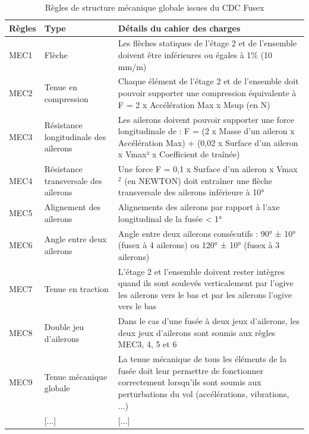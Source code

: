 \begin{table}[h!]
\centering
\begin{tabular}{|p{1.2cm}|p{4cm}|p{10cm}|}
\hline
Règles & Type & Détails du cahier des charges \\ \hline

MEC1  & Flèche & Les flèches statiques de l’étage 2 et de l’ensemble doivent être inférieures ou égales à 1\% (10 mm/m) \\ \hline
MEC2  & Tenue en compression & Chaque élément de l’étage 2 et de l’ensemble doit pouvoir supporter une compression équivalente à F = 2 x Accélération Max x Msup (en N) \\ \hline
MEC3  & Résistance longitudinale des ailerons & Les ailerons doivent pouvoir supporter une force longitudinale de : F = (2 x Masse d’un aileron x Accélération Max) + (0,02 x Surface d’un aileron x Vmax² x Coefficient de traînée) \\ \hline
MEC4  & Résistance transversale des ailerons & Une force F = 0,1 x Surface d’un aileron x Vmax$^2$ (en NEWTON) doit entraîner une flèche transversale des ailerons inférieure à 10° \\ \hline
MEC5  & Alignement des ailerons & Alignements des ailerons par rapport à l’axe longitudinal de la fusée < 1° \\ \hline
MEC6  & Angle entre deux ailerons & Angle entre deux ailerons consécutifs : 90° ± 10° (fusex à 4 ailerons) ou 120° ± 10° (fusex à 3 ailerons) \\ \hline
MEC7  & Tenue en traction & L’étage 2 et l’ensemble doivent rester intègres quand ils sont soulevés verticalement par l'ogive les ailerons vers le bas et par les ailerons l'ogive vers le bas \\ \hline
MEC8  & Double jeu d'ailerons & Dans le cas d’une fusée à deux jeux d’ailerons, les deux jeux d’ailerons sont soumis aux règles MEC3, 4, 5 et 6 \\ \hline
MEC9  & Tenue mécanique globale & La tenue mécanique de tous les éléments de la fusée doit leur permettre de fonctionner correctement lorsqu’ils sont soumis aux perturbations du vol (accélérations, vibrations, ...) \\ \hline
[...] &[...] &[...] \\ \hline

\end{tabular}
\caption{Règles de structure mécanique globale issues du \acrshort{CDC} \gls{Fusex} \cite[p.~32-33]{CDC_BiEtage}}
\end{table}

